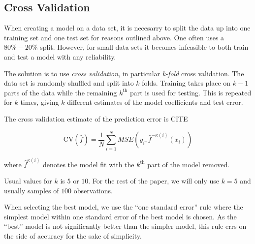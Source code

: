 \subsection{Cross Validation}
\label{sec:cv}

When creating a model on a data set, it is necesarry to split the data up
into one training set and one test set for reasons outlined above. One often
uses a \(80\% - 20\%\) split. However, for small data sets it becomes infeasible
to both train and test a model with any reliability.

The solution is to use \textit{cross validation}, in particular \textit{k-fold}
cross validation. The data set is randomly shuffled and split into \(k\) folds.
Training takes place on \(k-1\) parts of the data while the remaining
\(k^{\text{th}}\) part is used for testing. This is repeated for \(k\) times,
giving \(k\) different estimates of the model coefficients and test error.

The cross validation estimate of the prediction error is CITE

\begin{equation*}
  \text{CV}(\hat f) = \frac{1}{N}\sum_{i=1}^{N}MSE(y_{i}, \hat f^{-\kappa(i)}(x_{i}))
\end{equation*}

where \(\hat f^{\kappa(i)}\) denotes the model fit with the \(k^{\text{th}}\)
part of the model removed.

Usual values for \(k\) is \(5\) or \(10\). For the rest of the paper, we will
only use \(k=5\) and usually samples of \(100\) observations. 

When selecting the best model, we use the ``one standard error'' rule where the
simplest model within one standard error of the best model is chosen. As the
``best'' model is not significantly better than the simpler model, this rule
errs on the side of accuracy for the sake of simplicity. 

